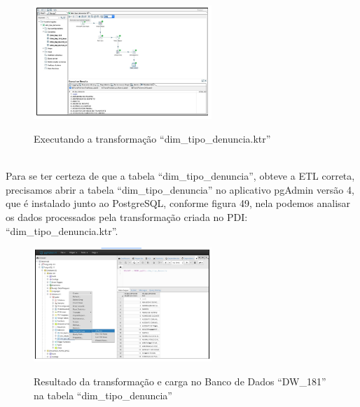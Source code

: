 \begin{figure}[H]
	\vspace*{0,2cm}
    \centering
    \caption{Executando a transforma\c{c}\~{a}o ``dim\_tipo\_denuncia.ktr''}
    \includegraphics[width=0.6\textwidth]{./04-figuras/figura-trans-tipo-denuncia}
    \label{fig:ilustfigtranstipodenuncia}
\end{figure}
\vspace*{-0,9cm}
{\raggedright {}} \\

Para se ter certeza de que a tabela ``dim\_tipo\_denuncia'', obteve a ETL correta, precisamos abrir a tabela ``dim\_tipo\_denuncia'' no aplicativo pgAdmin vers\~{a}o 4, que \'{e} instalado junto ao PostgreSQL, conforme figura 49, nela podemos analisar os dados processados pela transforma\c{c}\~{a}o criada no PDI: ``dim\_tipo\_denuncia.ktr''.

\begin{figure}[H]
	\vspace*{0,2cm}
    \centering
    \caption{Resultado da transforma\c{c}\~{a}o e carga no Banco de Dados ``DW\_181'' na tabela ``dim\_tipo\_denuncia''}
    \includegraphics[width=0.6\textwidth]{./04-figuras/figura-res-tipo-denuncia}
    \label{fig:ilustfigrestipodenuncia}
\end{figure}
\vspace*{-0,9cm}
{\raggedright {}} \\

